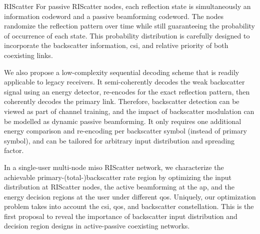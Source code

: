 \documentclass[journal]{IEEEtran}
\begin{document}
\begin{section}{RIScatter}
	\label{sc:riscatter}
	For passive RIScatter nodes, each reflection state is simultaneously an information codeword and a passive beamforming codeword.
	The nodes randomize the reflection pattern over time while still guaranteeing the probability of occurrence of each state.
	This probability distribution is carefully designed to incorporate the backscatter information, \gls{csi}, and relative priority of both coexisting links.

	We also propose a low-complexity sequential decoding scheme that is readily applicable to legacy receivers.
	It semi-coherently decodes the weak backscatter signal using an energy detector, re-encodes for the exact reflection pattern, then coherently decodes the primary link.
	Therefore, backscatter detection can be viewed as part of channel training, and the impact of backscatter modulation can be modelled as dynamic passive beamforming.
	It only requires one additional energy comparison and re-encoding per backscatter symbol (instead of primary symbol), and can be tailored for arbitrary input distribution and spreading factor.

	In a single-user multi-node \gls{miso} RIScatter network, we characterize the achievable primary-(total-)backscatter rate region by optimizing the input distribution at RIScatter nodes, the active beamforming at the \gls{ap}, and the energy decision regions at the user under different \gls{qos}.
	Uniquely, our optimization problem takes into account the \gls{csi}, \gls{qos}, and backscatter constellation.
	This is the first proposal to reveal the importance of backscatter input distribution and decision region designs in active-passive coexisting networks.
\end{section}
\end{document}
